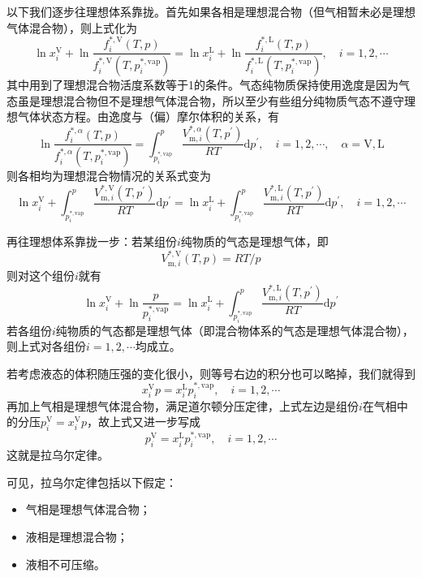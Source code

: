 \documentclass[main.tex]{subfiles}
\begin{document}
以下我们逐步往理想体系靠拢。首先如果各相是理想混合物（但气相暂未必是理想气体混合物），则上式化为
\[\ln x_i^\text{V}+\ln\frac{f_i^{*,\text{V}}\left(T,p\right)}{f_i^{*,\text{V}}\left(T,p_i^{*,\text{vap}}\right)}=\ln x_i^\text{L}+\ln\frac{f_i^{*,\text{L}}\left(T,p\right)}{f_i^{*,\text{L}}\left(T,p_i^{*,\text{vap}}\right)},\quad i=1,2,\cdots\]
其中用到了理想混合物活度系数等于1的条件。气态纯物质保持使用逸度是因为气态虽是理想混合物但不是理想气体混合物，所以至少有些组分纯物质气态不遵守理想气体状态方程。由逸度与（偏）摩尔体积的关系，有
\[\ln\frac{f_i^{*,\alpha}\left(T,p\right)}{f_i^{*,\alpha}\left(T,p_i^{*,\text{vap}}\right)}=\int_{p_i^{*,\text{vap}}}^p\frac{V_{\text{m},i}^{*,\alpha}\left(T,p^\prime\right)}{RT}\mathrm{d}p^\prime,\quad i=1,2,\cdots,\quad \alpha=\text{V},\text{L}\]
则各相均为理想混合物情况的关系式变为
\[\ln x_i^\text{V}+\int_{p_i^{*,\text{vap}}}^{p}\frac{V_{\text{m},i}^{*,\text{V}}\left(T,p^\prime\right)}{RT}\mathrm{d}p^\prime=\ln x_i^\text{L}+\int_{p_i^{*,\text{vap}}}^{p}\frac{V_{\text{m},i}^{*,\text{L}}\left(T,p^\prime\right)}{RT}\mathrm{d}p^\prime,\quad i=1,2,\cdots\]

再往理想体系靠拢一步：若某组份$i$纯物质的气态是理想气体，即
\[V_{\text{m},i}^{*,\text{V}}\left(T,p\right)=RT/p\]
则对这个组份$i$就有
\[\ln x_i^\text{V}+\ln\frac{p}{p_i^{*,\text{vap}}}=\ln x_i^\text{L}+\int_{p_i^{*,\text{vap}}}^{p}\frac{V_{\text{m},i}^{*,\text{L}}\left(T,p^\prime\right)}{RT}\mathrm{d}p^\prime \]
若各组份$i$纯物质的气态都是理想气体（即混合物体系的气态是理想气体混合物），则上式对各组份$i=1,2,\cdots$均成立。

若考虑液态的体积随压强的变化很小，则等号右边的积分也可以略掉，我们就得到
\[x_i^\text{V}p=x_i^\text{L}p_i^{*,\text{vap}},\quad i=1,2,\cdots\]
再加上气相是理想气体混合物，满足道尔顿分压定律，上式左边是组份$i$在气相中的分压$p^\text{V}_i=x_i^\text{V}p$，故上式又进一步写成
\[p_i^\text{V}=x_i^\text{L}p_i^{*,\text{vap}},\quad i=1,2,\cdots\]
这就是拉乌尔定律。

可见，拉乌尔定律包括以下假定：
\begin{itemize}
    \item 气相是理想气体混合物；
    \item 液相是理想混合物；
    \item 液相不可压缩。
\end{itemize}
\end{document}
